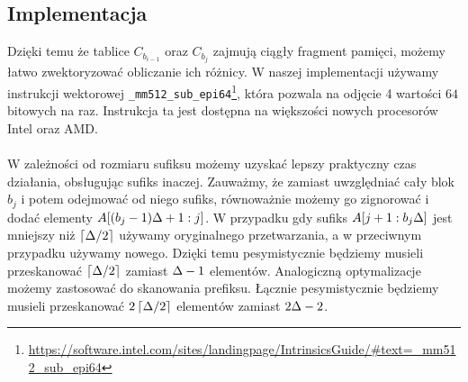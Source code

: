 \subsection{Implementacja}
\label{sec:cdlmw-sf-impl}
Dzięki temu że tablice $C_{b_{i-1}}$ oraz $C_{b_j}$ zajmują ciągły fragment pamięci, możemy łatwo zwektoryzować obliczanie ich różnicy. W naszej implementacji używamy instrukcji wektorowej \lstinline{_mm512_sub_epi64}\footnote{\url{ https://software.intel.com/sites/landingpage/IntrinsicsGuide/\#text=_mm512_sub_epi64}}, która pozwala na odjęcie 4 wartości $64$bitowych na raz. Instrukcja ta jest dostępna na większości nowych procesorów Intel oraz AMD.\\
\\
W zależności od rozmiaru sufiksu możemy uzyskać lepszy praktyczny czas działania, obsługując sufiks inaczej. Zauważmy, że zamiast uwzględniać cały blok $b_j$ i potem odejmować od niego sufiks, równoważnie możemy go zignorować i dodać elementy $A[(b_j-1)\Delta+1:j]$. W przypadku gdy sufiks $A[j+1:b_j\Delta]$ jest mniejszy niż $\left\lceil\Delta/2\right\rceil$ używamy oryginalnego przetwarzania, a w przeciwnym przypadku używamy nowego. Dzięki temu pesymistycznie będziemy musieli przeskanować $\left\lceil\Delta/2\right\rceil$ zamiast $\Delta-1$ elementów. Analogiczną optymalizacje możemy zastosować do skanowania prefiksu. Łącznie pesymistycznie będziemy musieli przeskanować $2\left\lceil\Delta/2\right\rceil$ elementów zamiast $2\Delta-2$.
\newpage
